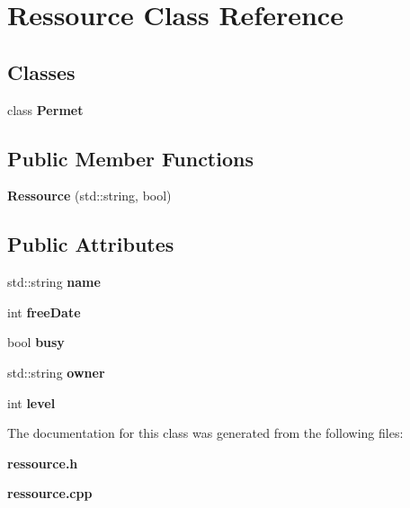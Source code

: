 \section{Ressource Class Reference}
\label{class_ressource}
\subsection*{Classes}
\begin{DoxyCompactItemize}
\item 
class {\bf Permet}
\end{DoxyCompactItemize}
\subsection*{Public Member Functions}
\begin{DoxyCompactItemize}
\item 
{\bfseries Ressource} (std\-::string, bool)\label{class_ressource_a91ab7c65e2b98f01aac9e08849e7d276}

\end{DoxyCompactItemize}
\subsection*{Public Attributes}
\begin{DoxyCompactItemize}
\item 
std\-::string {\bfseries name}\label{class_ressource_a118b7b5bb76663cfe167dd64624cc398}

\item 
int {\bfseries free\-Date}\label{class_ressource_aaf52ebe0467c852ae70a6c3b89b7497d}

\item 
bool {\bfseries busy}\label{class_ressource_a6520b6e1561acf4f096dece3af96a008}

\item 
std\-::string {\bfseries owner}\label{class_ressource_a9022ee0c401370e9dd3259c6b4c7ce8f}

\item 
int {\bfseries level}\label{class_ressource_a4d743b7bfd69ed4deaca59c7ecc57a4d}

\end{DoxyCompactItemize}


The documentation for this class was generated from the following files\-:\begin{DoxyCompactItemize}
\item 
{\bf ressource.\-h}\item 
{\bf ressource.\-cpp}\end{DoxyCompactItemize}
